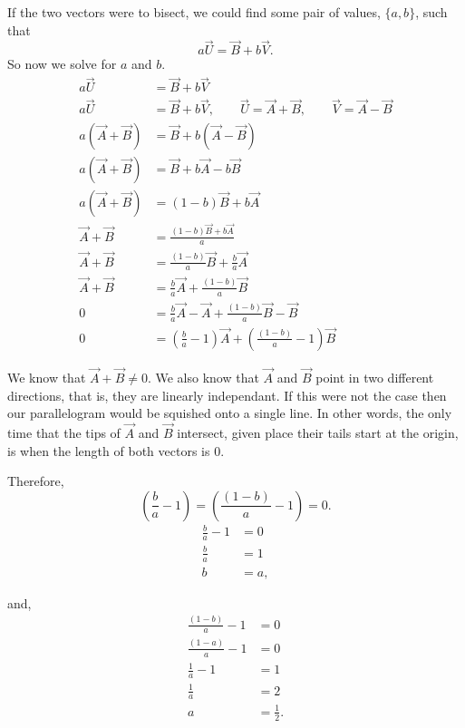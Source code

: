 \documentclass[main.tex]{subfiles}
\begin{document}
If the two vectors were to bisect, we could find some pair of values,
$\{a,b\}$, such that \[ a\vec{U} = \vec{B} + b\vec{V}. \]
So now we solve for $a$ and $b$.
\begin{align*}
a\vec{U} &= \vec{B} + b\vec{V}\\
a\vec{U} &=  \vec{B} + b\vec{V},
\hspace{2em}\vec{U} = \vec{A}+\vec{B},
\hspace{2em}\vec{V} = \vec{A}-\vec{B}\\
a(\vec{A} + \vec{B}) &= \vec{B} + b(\vec{A}-\vec{B})\\
a(\vec{A} + \vec{B}) &= \vec{B} + b\vec{A}-b\vec{B}\\
a(\vec{A} + \vec{B}) &= (1-b)\vec{B} + b\vec{A}\\
\vec{A} + \vec{B} &= \frac{(1-b)\vec{B} + b\vec{A}}{a}\\
\vec{A} + \vec{B} &= \frac{(1-b)}{a}\vec{B} + \frac{b}{a}\vec{A}\\
\vec{A} + \vec{B} &= \frac{b}{a}\vec{A} + \frac{(1-b)}{a}\vec{B} \\
0 &= \frac{b}{a}\vec{A} -\vec{A} + \frac{(1-b)}{a}\vec{B}  -\vec{B}\\
0 &= (\frac{b}{a} - 1)\vec{A} + (\frac{(1-b)}{a} - 1)\vec{B}
\end{align*}

We know that $\vec{A} + \vec{B} \neq 0$. We also know that $\vec{A}$ and $\vec{B}$
point in two different directions, that is, they are linearly independant. If this
were not the case then our parallelogram would be squished onto a single line.
In other words, the only time that the tips of $\vec{A}$ and $\vec{B}$ intersect,
given place their tails start at the origin, is when the length of both vectors is $0$.

Therefore,
\[(\frac{b}{a} - 1) = (\frac{(1-b)}{a} - 1) = 0.\]
\begin{align*}
\frac{b}{a} - 1 &= 0\\
\frac{b}{a} &= 1\\
b &= a,
\end{align*}

and,
\begin{align*}
\frac{(1-b)}{a} - 1 &= 0\\
\frac{(1-a)}{a} - 1 &= 0\\
\frac{1}{a} - 1 &= 1\\
\frac{1}{a} &= 2\\
a &= \frac{1}{2}.
\end{align*}
\end{document}
